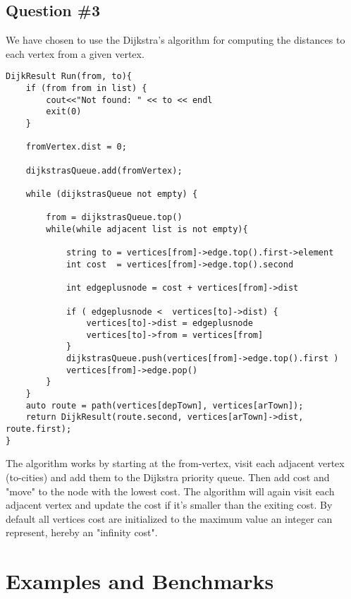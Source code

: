 \subsection{Question \#3}
We have chosen to use the Dijkstra's algorithm for computing the distances to each vertex from a given vertex.
\bigskip
\begin{lstlisting}
DijkResult Run(from, to){
	if (from from in list) {
		cout<<"Not found: " << to << endl
		exit(0)
	}

	fromVertex.dist = 0;

	dijkstrasQueue.add(fromVertex);

	while (dijkstrasQueue not empty) {

		from = dijkstrasQueue.top()
		while(while adjacent list is not empty){

			string to = vertices[from]->edge.top().first->element
			int cost  = vertices[from]->edge.top().second

			int edgeplusnode = cost + vertices[from]->dist

			if ( edgeplusnode <  vertices[to]->dist) {
				vertices[to]->dist = edgeplusnode
				vertices[to]->from = vertices[from]
			}
			dijkstrasQueue.push(vertices[from]->edge.top().first )
			vertices[from]->edge.pop()
		}
	}
	auto route = path(vertices[depTown], vertices[arTown]);
	return DijkResult(route.second, vertices[arTown]->dist, route.first);
}
\end{lstlisting}
\bigskip
The algorithm works by starting at the from-vertex, visit each adjacent vertex (to-cities) and add them to the Dijkstra priority queue. Then add cost and "move" to the node with the lowest cost.
The algorithm will again visit each adjacent vertex and update the cost if it's smaller than the exiting cost.
By default all vertices cost are initialized to the maximum value an integer can represent, hereby an "infinity cost".

\section{Examples and Benchmarks}
